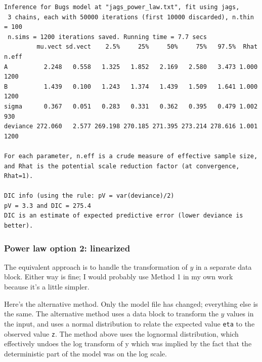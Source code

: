 \documentclass[
  13,
  letterpaper,
]{report}
\begin{document}
\begin{verbatim}
Inference for Bugs model at "jags_power_law.txt", fit using jags,
 3 chains, each with 50000 iterations (first 10000 discarded), n.thin = 100
 n.sims = 1200 iterations saved. Running time = 7.7 secs
         mu.vect sd.vect    2.5%     25%     50%     75%   97.5%  Rhat n.eff
A          2.248   0.558   1.325   1.852   2.169   2.580   3.473 1.000  1200
B          1.439   0.100   1.243   1.374   1.439   1.509   1.641 1.000  1200
sigma      0.367   0.051   0.283   0.331   0.362   0.395   0.479 1.002   930
deviance 272.060   2.577 269.198 270.185 271.395 273.214 278.616 1.001  1200

For each parameter, n.eff is a crude measure of effective sample size,
and Rhat is the potential scale reduction factor (at convergence, Rhat=1).

DIC info (using the rule: pV = var(deviance)/2)
pV = 3.3 and DIC = 275.4
DIC is an estimate of expected predictive error (lower deviance is better).
\end{verbatim}

\subsubsection{Power law option 2:
linearized}\label{power-law-option-2-linearized}

The equivalent approach is to handle the transformation of \(y\) in a
separate data block. Either way is fine; I would probably use Method 1
in my own work because it's a little simpler.

Here's the alternative method. Only the model file has changed;
everything else is the same. The alternative method uses a data block to
transform the \(y\) values in the input, and uses a normal distribution
to relate the expected value \texttt{eta} to the observed value
\texttt{z}. The method above uses the lognormal distribution, which
effectively undoes the log transform of y which was implied by the fact
that the deterministic part of the model was on the log scale.
\end{document}
